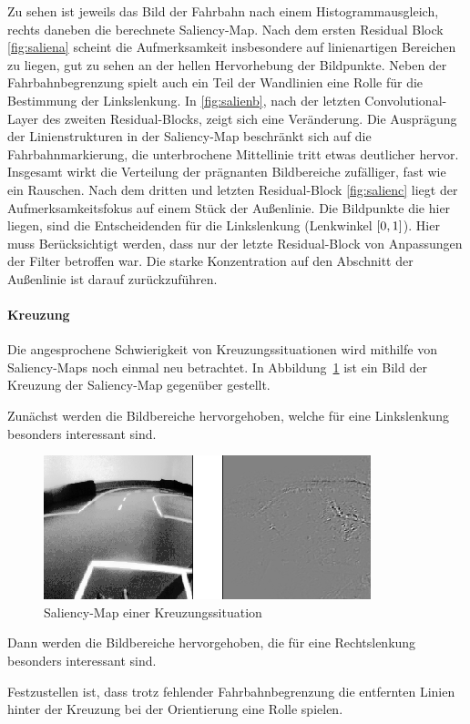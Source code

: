Zu sehen ist jeweils das Bild der Fahrbahn nach einem Histogrammausgleich, rechts daneben die berechnete Saliency-Map. Nach dem ersten Residual Block \ref{fig:saliena} scheint die Aufmerksamkeit insbesondere auf linienartigen Bereichen zu liegen, gut zu sehen an der hellen Hervorhebung der Bildpunkte. Neben der Fahrbahnbegrenzung spielt auch ein Teil der Wandlinien eine Rolle für die Bestimmung der Linkslenkung. In \ref{fig:salienb}, nach der letzten Convolutional-Layer des zweiten Residual-Blocks, zeigt sich eine Veränderung. Die Ausprägung der Linienstrukturen in der Saliency-Map beschränkt sich auf die Fahrbahnmarkierung, die unterbrochene Mittellinie tritt etwas deutlicher hervor. Insgesamt wirkt die Verteilung der prägnanten Bildbereiche zufälliger, fast wie ein Rauschen.
Nach dem dritten und letzten Residual-Block \ref{fig:salienc} liegt der Aufmerksamkeitsfokus auf einem Stück der Außenlinie.  Die Bildpunkte die hier liegen, sind die Entscheidenden für die Linkslenkung (Lenkwinkel $\interval{0}{1}$). Hier muss Berücksichtigt werden, dass nur der letzte Residual-Block von Anpassungen der Filter betroffen war. Die starke Konzentration auf den Abschnitt der Außenlinie ist darauf zurückzuführen.

\paragraph{Kreuzung}
Die angesprochene Schwierigkeit von Kreuzungssituationen wird mithilfe von Saliency-Maps noch einmal neu betrachtet. In Abbildung~\ref{img:kreuzung} ist ein Bild der Kreuzung der Saliency-Map gegenüber gestellt.

Zunächst werden die Bildbereiche hervorgehoben, welche für eine Linkslenkung besonders interessant sind. 

\begin{figure}[h]
	\centering
	\includegraphics[scale=1.3]{figures/Kreuzung.png}
	\caption{Saliency-Map einer Kreuzungssituation}
	\label{img:kreuzung}
\end{figure}

Dann werden die Bildbereiche hervorgehoben, die für eine Rechtslenkung besonders interessant sind.

Festzustellen ist, dass trotz fehlender Fahrbahnbegrenzung die entfernten Linien hinter der Kreuzung bei der Orientierung eine Rolle spielen.  




